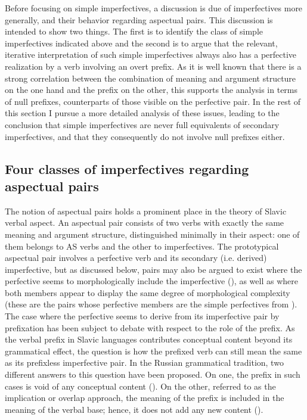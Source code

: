 \documentclass[output=paper]{langscibook}
\begin{document}
Before focusing on simple imperfectives, a discussion is due of imperfectives more generally, and their behavior regarding aspectual pairs. This discussion is intended to show two things. The first is to identify the class of simple imperfectives indicated above and the second is to argue that the relevant, iterative interpretation of such simple imperfectives always also has a perfective realization by a verb involving an overt prefix. As it is well known that there is a strong correlation between the combination of meaning and argument structure on the one hand and the prefix on the other, this supports the analysis in terms of null prefixes, counterparts of those visible on the perfective pair. In the rest of this section I pursue a more detailed analysis of these issues, leading to the conclusion that simple imperfectives are never full equivalents of secondary imperfectives, and that they consequently do not involve null prefixes either.

\subsection{Four classes of imperfectives regarding aspectual pairs}\label{ars:sec:pairs}\largerpage[2]

The notion of aspectual pairs holds a prominent place in the theory of Slavic verbal aspect. An aspectual pair consists of two verbs with exactly the same meaning and argument structure, distinguished minimally in their aspect: one of them belongs to AS verbs and the other to imperfectives. The prototypical aspectual pair involves a perfective verb and its secondary (i.e. derived) imperfective, but as discussed below, pairs may also be argued to exist where the perfective seems to morphologically include the imperfective (\cite{Janda.2011}), as well as where both members appear to display the same degree of morphological complexity (these are the pairs whose perfective members are the simple perfectives from ). The case where the perfective seems to derive from its imperfective pair by prefixation has been subject to debate with respect to the role of the prefix. As the verbal prefix in Slavic languages contributes conceptual content beyond its grammatical effect, the question is how the prefixed verb can still mean the same as its prefixless imperfective pair. In the Russian grammatical tradition, two different answers to this question have been proposed. On one, the prefix in such cases is void of any conceptual content (\cite{Vinogradov.1938, Šahmatov.1941, Švedova.1980}). On the other, referred to as the implication or overlap approach, the meaning of the prefix is included in the meaning of the verbal base; hence, it does not add any new content (\cite{Isačenko.1960, Timberlake.2004, Janda.2011}).
\end{document}
